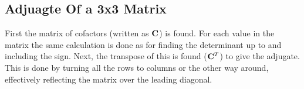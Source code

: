 \documentclass[class=article, crop=false]{standalone}
\begin{document}
\subsection*{Adjuagte Of a 3x3 Matrix}
First the matrix of cofactors (written as $\bold{C}$) is found. For each value in the matrix the same calculation is done as for finding the determinant up to and including the sign. Next, the transpose of this is found ($\bold{C}^T$) to give the adjugate. This is done by turning all the rows to columns or the other way around, effectively reflecting the matrix over the leading diagonal.  
\end{document}
